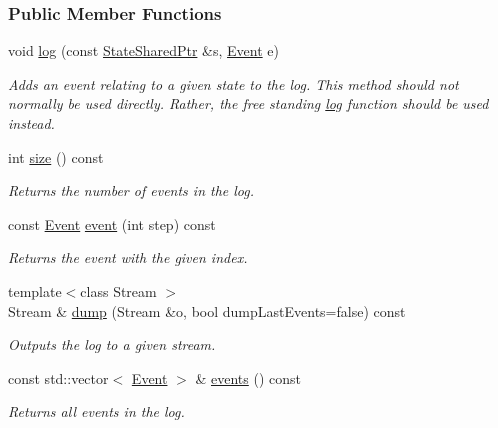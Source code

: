 \subsubsection*{Public Member Functions}
\begin{DoxyCompactItemize}
\item 
void \hyperlink{structAlgorithmLog_a4d7df9a9a2e4344bc0fd4bca71d6e257}{log} (const \hyperlink{structAlgorithmLog_aa938278830c04450a447beb9ff249b3f}{State\+Shared\+Ptr} \&s, \hyperlink{structAlgorithmLog_a7e0d48b82e3a6cbe4128c08f936fee9a}{Event} e)
\begin{DoxyCompactList}\small\item\em Adds an event relating to a given state to the log. This method should not normally be used directly. Rather, the free standing \hyperlink{structAlgorithmLog_a4d7df9a9a2e4344bc0fd4bca71d6e257}{log} function should be used instead. \end{DoxyCompactList}\item 
int \hyperlink{structAlgorithmLog_a744310037fb9eabb33385ca19ba3765b}{size} () const 
\begin{DoxyCompactList}\small\item\em Returns the number of events in the log. \end{DoxyCompactList}\item 
const \hyperlink{structAlgorithmLog_a7e0d48b82e3a6cbe4128c08f936fee9a}{Event} \hyperlink{structAlgorithmLog_a4ce6fd8da6a2a7ef6033269ce429b4c7}{event} (int step) const 
\begin{DoxyCompactList}\small\item\em Returns the event with the given index. \end{DoxyCompactList}\item 
{\footnotesize template$<$class Stream $>$ }\\Stream \& \hyperlink{structAlgorithmLog_a20bc22ab4819a8ac83c6fee2153cab5f}{dump} (Stream \&o, bool dump\+Last\+Events=false) const 
\begin{DoxyCompactList}\small\item\em Outputs the log to a given stream. \end{DoxyCompactList}\item 
const std\+::vector$<$ \hyperlink{structAlgorithmLog_a7e0d48b82e3a6cbe4128c08f936fee9a}{Event} $>$ \& \hyperlink{structAlgorithmLog_ae04d5de3725da8925dbf87c150ba9832}{events} () const 
\begin{DoxyCompactList}\small\item\em Returns all events in the log. \end{DoxyCompactList}\item 

\end{DoxyCompactItemize}
